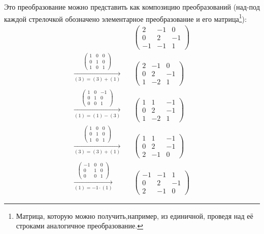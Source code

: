 \documentclass[a4paper,12pt]{article}
\begin{document}
\begin{solution}
    Это преобразование можно представить как композицию преобразований (над-под каждой стрелочкой обозначено элементарное преобразование и его матрица\footnote{Матрица, которую можно получить,например, из единичной, проведя над её строками аналогичное преобразование.}):
    \begin{equation*}
    \begin{split}
      &\begin{pmatrix}
        2 & -1 & 0\\
        0 & 2 & -1\\
        -1 & -1 & 1
      \end{pmatrix}\\
      \xrightarrow[(3) = (3) + (1)]{\left(\begin{smallmatrix}1 & 0 & 0\\0 & 1 & 0\\1 & 0 & 1\end{smallmatrix}\right)}\quad &\begin{pmatrix}
          2 & -1 & 0\\
          0 & 2 & -1\\
          1 & -2 & 1
        \end{pmatrix}\\
      \xrightarrow[(1) = (1) - (3)]{\left(\begin{smallmatrix}1 & 0 & -1\\0 & 1 & 0\\0 & 0 & 1\end{smallmatrix}\right)}\quad &\begin{pmatrix}
          1 & 1 & -1\\
          0 & 2 & -1\\
          1 & -2 & 1
        \end{pmatrix}\\
      \xrightarrow[(3) = (3) + (1)]{\left(\begin{smallmatrix}1 & 0 & 0\\0 & 1 & 0\\1 & 0 & 1\end{smallmatrix}\right)}\quad &\begin{pmatrix}
          1 & 1 & -1\\
          0 & 2 & -1\\
          2 & -1 & 0
        \end{pmatrix}\\
      \xrightarrow[(1) = -1 \cdot (1)]{\left(\begin{smallmatrix}-1 & 0 & 0\\0 & 1 & 0\\0 & 0 & 1\end{smallmatrix}\right)}\quad &\begin{pmatrix}
          -1 & -1 & 1\\
          0 & 2 & -1\\
          2 & -1 & 0
        \end{pmatrix}
    \end{split}
    \end{equation*}
    

\end{solution}
\end{document}
